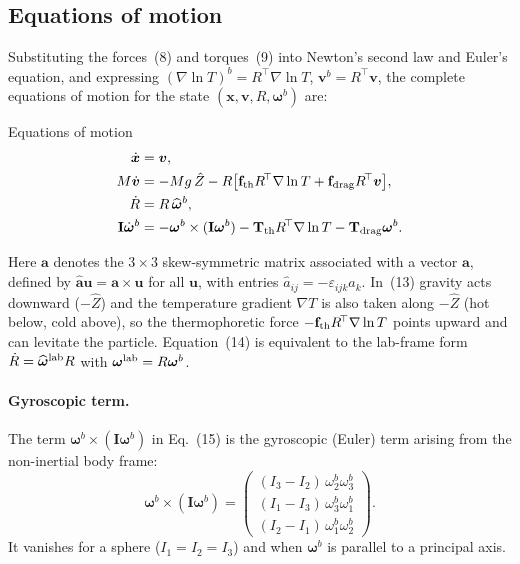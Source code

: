 \documentclass[11pt]{article}
\newcommand{\chg}[1]{\marginpar{\raggedright\footnotesize\textcolor{red!70!black}{\textsf{#1}}}}
\newcommand{\vect}[1]{\bm{#1}}
\newcommand{\T}{^{\!\top}}
\begin{document}
\subsection{Equations of motion}
Substituting the forces~(8) and torques~(9) into Newton's second law and Euler's equation, and expressing $(\nabla\ln T)^b=R\T\nabla\ln T$, $\vect v^b=R\T\vect v$, the complete equations of motion for the state $(\vect x,\vect v,R,\vect\omega^b)$ are:
\begin{eqbox}{Equations of motion}
\begin{align}
  \dot{\vect x} &= \vect v,\\
  M\dot{\vect v} &= -Mg\,\hat Z - R\big[\mathbf f_{\rm th}R\T\nabla\ln T+\mathbf f_{\rm drag}R\T\vect v\big],\\
  \dot R &= R\,\widehat{\vect\omega}^b,\\
  \mathbf I\dot{\vect\omega}^b &= -\vect\omega^b\times(\mathbf I\vect\omega^b)-\mathbf T_{\rm th}R\T\nabla\ln T-\mathbf T_{\rm drag}\vect\omega^b.
\end{align}
\end{eqbox}
Here $\widehat{\vect a}$ denotes the $3\times3$ skew-symmetric matrix associated with a vector $\vect a$, defined by $\widehat{\vect a}\vect u=\vect a\times\vect u$ for all $\vect u$, with entries $\widehat a_{ij}=-\varepsilon_{ijk}a_k$. In~(13) gravity acts downward ($-\hat Z$) and the temperature gradient $\nabla T$ is also taken along $-\hat Z$ (hot below, cold above),\chg{C4} so the thermophoretic force $-\mathbf f_{\rm th}R\T\nabla\ln T$ points upward and can levitate the particle. Equation~(14) is equivalent to the lab-frame form $\dot R=\widehat{\vect\omega}^{\rm lab}R$ with $\vect\omega^{\rm lab}=R\vect\omega^b$.

\paragraph{Gyroscopic term.} The term $\vect\omega^b\times(\mathbf I\vect\omega^b)$ in Eq.~(15) is the gyroscopic (Euler) term arising from the non-inertial body frame:
\begin{equation}
  \vect\omega^b\times(\mathbf I\vect\omega^b) = \begin{pmatrix}(I_3-I_2)\,\omega^b_2\omega^b_3\\ (I_1-I_3)\,\omega^b_3\omega^b_1\\ (I_2-I_1)\,\omega^b_1\omega^b_2\end{pmatrix}.
\end{equation}
It vanishes for a sphere ($I_1=I_2=I_3$) and when $\vect\omega^b$ is parallel to a principal axis.
\end{document}
